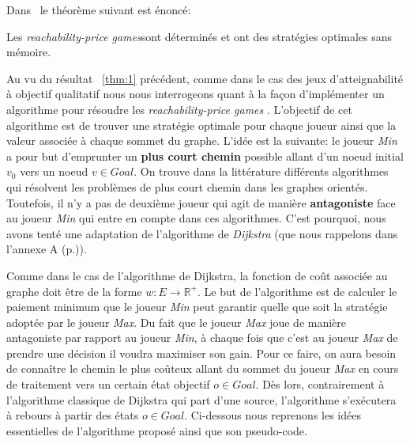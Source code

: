 


Dans~\cite{DBLP:conf/lfcs/BrihayePS13} le théorème suivant est énoncé:

\begin{thm}
	\label{thm:1}
	Les \og\textit{reachability-price games}\fg  sont déterminés et ont des stratégies optimales sans mémoire.
\end{thm}


Au vu du résultat ~\ref{thm:1} précédent, comme dans le cas des jeux d'atteignabilité à objectif qualitatif nous nous interrogeons quant à la façon d'implémenter un algorithme pour résoudre les \og \textit{reachability-price games} \fg. L'objectif de cet algorithme est de trouver une stratégie optimale pour chaque joueur ainsi que la valeur associée à chaque sommet du graphe. L'idée est la suivante: le joueur \textit{Min} a pour but d'emprunter un \textbf{plus court chemin} possible allant d'un noeud initial $v_{0}$ vers un noeud $v \in Goal$. On trouve dans la littérature différents algorithmes qui résolvent les problèmes de plus court chemin dans les graphes orientés. Toutefois, il n'y a pas de deuxième joueur qui agit de manière \textbf{antagoniste} face au joueur \textit{Min} qui entre en compte dans ces algorithmes. C'est pourquoi, nous avons tenté une adaptation de l'algorithme de \textit{Dijkstra} (que nous rappelons dans l'annexe A (p.\pageref{algo:dijkstra})).

Comme dans le cas de l'algorithme de Dijkstra, la fonction de coût associée au graphe doit être de la forme $w : E \rightarrow \mathbb{R}^{+}$. Le but de l'algorithme est de calculer le paiement minimum que le joueur \textit{Min} peut garantir quelle que soit la stratégie adoptée par le joueur \textit{Max}. Du fait que le joueur \textit{Max} joue de manière antagoniste par rapport au joueur \textit{Min}, à chaque fois que c'est au joueur \textit{Max} de prendre une décision il voudra maximiser son gain. Pour ce faire, on aura besoin de connaître le chemin le plus coûteux allant du sommet du joueur \textit{Max} en cours de traitement vers un certain état objectif $o \in Goal$. Dès lors, contrairement à l'algorithme classique de Dijkstra qui part d'une source, l'algorithme s'exécutera à rebours à partir des états $o \in Goal$. Ci-dessous nous reprenons les idées essentielles de l'algorithme proposé ainsi que son pseudo-code.\\

